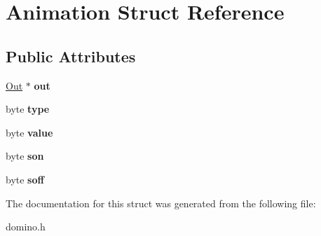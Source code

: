 \hypertarget{struct_animation}{}\section{Animation Struct Reference}
\label{struct_animation}
\subsection*{Public Attributes}
\begin{DoxyCompactItemize}
\item 
\hypertarget{struct_animation_a7cf5e9ea3a9db71a9d67bd81f5029994}{}\hyperlink{struct_out}{Out} $\ast$ {\bfseries out}\label{struct_animation_a7cf5e9ea3a9db71a9d67bd81f5029994}

\item 
\hypertarget{struct_animation_a010fc94d51437ac2416bbfabcc36f275}{}byte {\bfseries type}\label{struct_animation_a010fc94d51437ac2416bbfabcc36f275}

\item 
\hypertarget{struct_animation_a3e3bb3c63519f9ec5794e932cbd1f2c5}{}byte {\bfseries value}\label{struct_animation_a3e3bb3c63519f9ec5794e932cbd1f2c5}

\item 
\hypertarget{struct_animation_a99ea3df4c9a5ebdcf6082f15778b4cc7}{}byte {\bfseries son}\label{struct_animation_a99ea3df4c9a5ebdcf6082f15778b4cc7}

\item 
\hypertarget{struct_animation_a818320c8d39154508ed63677056ab5b7}{}byte {\bfseries soff}\label{struct_animation_a818320c8d39154508ed63677056ab5b7}

\end{DoxyCompactItemize}


The documentation for this struct was generated from the following file\+:\begin{DoxyCompactItemize}
\item 
domino.\+h\end{DoxyCompactItemize}
